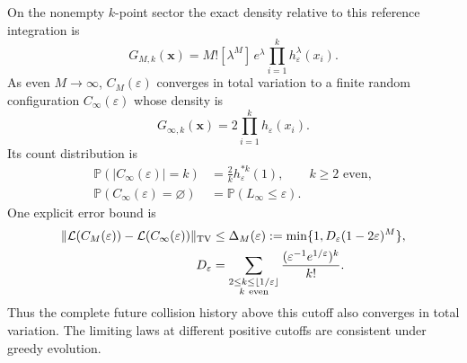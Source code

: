 \documentclass[11pt,letterpaper]{article}
\newcommand{\PP}{\mathbb P}\newcommand{\EE}{\mathbb E}
\begin{document}
\begin{theorem}
\label{thm:active-limit}
On the nonempty $k$-point sector the exact density relative to this
reference integration is
\begin{equation}\label{eq:active-finite-density}
 G_{M,k}(\mathbf x)=M![\lambda^M]\,
             e^\lambda\prod_{i=1}^k h_\varepsilon^\lambda(x_i).
\end{equation}
As even $M\to\infty$, $C_M(\varepsilon)$ converges in total variation to
a finite random configuration $C_\infty(\varepsilon)$ whose density is
\begin{equation}\label{eq:active-limit-density}
 G_{\infty,k}(\mathbf x)=2\prod_{i=1}^k h_\varepsilon(x_i).
\end{equation}
Its count distribution is
\begin{align}
 \PP(|C_\infty(\varepsilon)|=k)
   &=\frac2k h_\varepsilon^{*k}(1),\qquad k\ge2\text{ even},
       \label{eq:active-count}\\
 \PP(C_\infty(\varepsilon)=\varnothing)
   &=\PP(L_\infty\le\varepsilon).\nonumber
\end{align}
One explicit error bound is
\begin{align}
 \|\mathcal L(C_M(\varepsilon))-
           \mathcal L(C_\infty(\varepsilon))\|_{\rm TV}
 &\le\Delta_M(\varepsilon)
   :=\min\{1,D_\varepsilon(1-2\varepsilon)^M\},
       \label{eq:active-TV}\\
 D_\varepsilon&=
 \sum_{\substack{2\le k\le\lfloor1/\varepsilon\rfloor\\ k\ {\rm even}}}
       \frac{(\varepsilon^{-1}e^{1/\varepsilon})^k}{k!}.
       \nonumber
\end{align}
Thus the complete future collision history above this cutoff also
converges in total variation. The limiting laws at different positive
cutoffs are consistent under greedy evolution.
\end{theorem}
\end{document}

